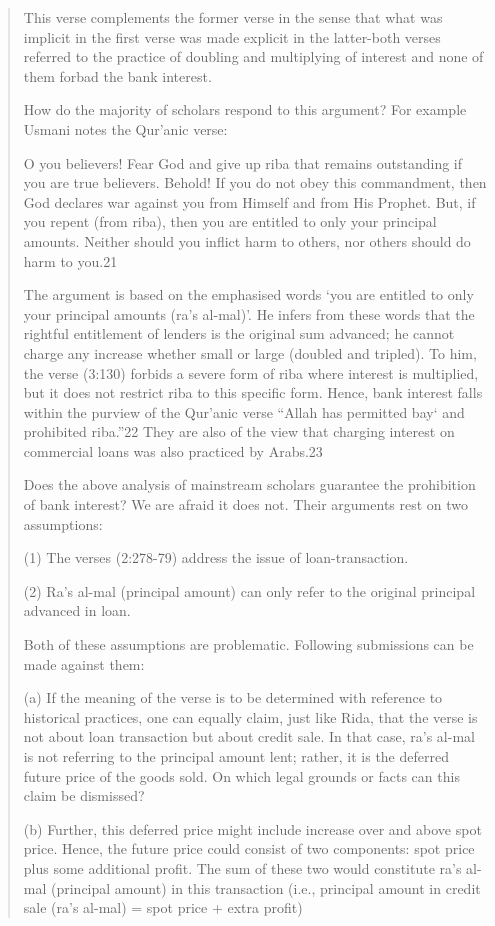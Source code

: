 \begin{quote}
This verse complements the former verse in the sense that what was implicit in the first verse was made explicit in the latter-both verses referred to the practice of doubling and multiplying of interest and none of them forbad the bank interest.

How do the majority of scholars respond to this argument? For example Usmani notes the Qur'anic verse:

O you believers! Fear God and give up riba that remains outstanding if you are true believers. Behold! If you do not obey this commandment, then God declares war against you from Himself and from His Prophet. But, if you repent (from riba), then you are entitled to only your principal amounts. Neither should you inflict harm to others, nor others should do harm to you.21

The argument is based on the emphasised words ‘you are entitled to only your principal amounts (ra's al-mal)'. He infers from these words that the rightful entitlement of lenders is the original sum advanced; he cannot charge any increase whether small or large (doubled and tripled). To him, the verse (3:130) forbids a severe form of riba where interest is multiplied, but it does not restrict riba to this specific form. Hence, bank interest falls within the purview of the Qur'anic verse “Allah has permitted bay‘ and prohibited riba.”22 They are also of the view that charging interest on commercial loans was also practiced by Arabs.23

Does the above analysis of mainstream scholars guarantee the prohibition of bank interest? We are afraid it does not. Their arguments rest on two assumptions:

(1) The verses (2:278-79) address the issue of loan-transaction.

(2) Ra's al-mal (principal amount) can only refer to the original principal advanced in loan.

Both of these assumptions are problematic. Following submissions can be made against them:

(a) If the meaning of the verse is to be determined with reference to historical practices, one can equally claim, just like Rida, that the verse is not about loan transaction but about credit sale. In that case, ra's al-mal is not referring to the principal amount lent; rather, it is the deferred future price of the goods sold. On which legal grounds or facts can this claim be dismissed?

(b) Further, this deferred price might include increase over and above spot price. Hence, the future price could consist of two components: spot price plus some additional profit. The sum of these two would constitute ra's al-mal (principal amount) in this transaction (i.e., principal amount in credit sale (ra's al-mal) = spot price + extra profit)


\end{quote}
